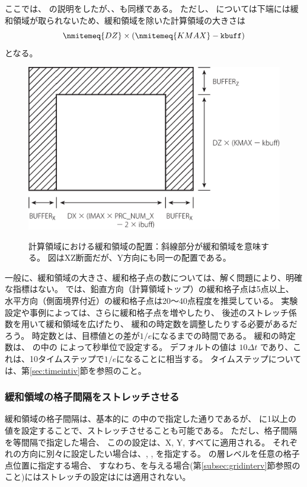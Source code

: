 ここでは、{\XDIR} の説明をしたが、{\YDIR}、{\ZDIR}も同様である。
ただし、{\ZDIR} については下端には緩和領域が取られないため、緩和領域を除いた計算領域の大きさは
\[
\nmitemeq{DZ} \times ( \nmitemeq{KMAX} - \verb|kbuff| )
\]
となる。


\begin{figure}[t]
\begin{center}
  \includegraphics[width=0.8\hsize]{./figure/buffer_xz.eps}\\
  \caption{計算領域における緩和領域の配置：斜線部分が緩和領域を意味する。
  図はXZ断面だが、Y方向にも同一の配置である。}
  \label{fig:buff_xz}
\end{center}
\end{figure}


一般に、緩和領域の大きさ、緩和格子点の数については、解く問題により、明確な指標はない。
\scalerm では、鉛直方向（計算領域トップ）の緩和格子点は5点以上、
水平方向（側面境界付近）の緩和格子点は20〜40点程度を推奨している。
実験設定や事例によっては、さらに緩和格子点を増やしたり、
後述のストレッチ係数を用いて緩和領域を広げたり、
緩和の時定数を調整したりする必要があるだろう。
時定数とは、目標値との差が$1/e$になるまでの時間である。
緩和の時定数は、
の中の
によって秒単位で設定する。
デフォルトの値は $10 \Delta t$ であり、これは、10タイムステップで$1/e$になることに相当する。
タイムステップについては、第\ref{sec:timeintiv}節を参照のこと。

\subsubsection{緩和領域の格子間隔をストレッチさせる}

緩和領域の格子間隔は、基本的に
の中ので指定した通りであるが、
に1以上の値を設定することで、ストレッチさせることも可能である。
ただし、格子間隔を等間隔で指定した場合、
このの設定は、X, Y, {\ZDIR}すべてに適用される。
それぞれの方向に別々に設定したい場合は、, , を指定する。
{\ZDIR}の層レベルを任意の格子点位置に指定する場合、
すなわち、を与える場合(第\ref{subsec:gridinterv}節参照のこと)にはストレッチの設定は{\ZDIR}には適用されない。

